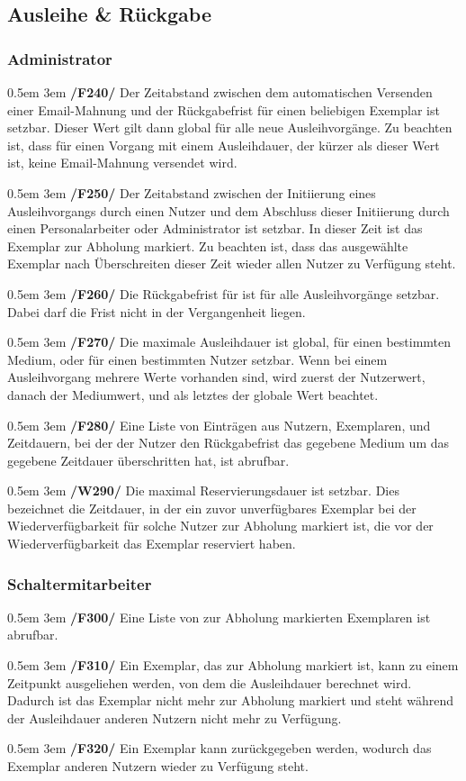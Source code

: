 \documentclass{article}
\newcommand{\specification}[3]{
	{\parindent 0.5em \hangindent 3em \hypertarget{spec:#1:#2}{\textbf{/#1#2/}} #3 \par \nobreak \vspace*{0.5em}}
}
\begin{document}
	\subsection{Ausleihe \& Rückgabe}
		\subsubsection{Administrator}
			\specification{F}{240}{Der Zeitabstand zwischen dem automatischen Versenden einer Email-Mahnung und der Rückgabefrist für einen beliebigen Exemplar ist setzbar.
				Dieser Wert gilt dann global für alle neue Ausleihvorgänge. Zu beachten ist, dass für einen Vorgang mit einem Ausleihdauer, der kürzer als dieser Wert ist, keine Email-Mahnung versendet wird. }
			\specification{F}{250}{Der Zeitabstand zwischen der Initiierung eines Ausleihvorgangs durch einen Nutzer und dem Abschluss dieser Initiierung durch einen Personalarbeiter oder Administrator ist setzbar.
				In dieser Zeit ist das Exemplar zur Abholung markiert. Zu beachten ist, dass das ausgewählte Exemplar nach Überschreiten dieser Zeit wieder allen Nutzer zu Verfügung steht. }
			\specification{F}{260}{Die Rückgabefrist für ist für alle Ausleihvorgänge setzbar. Dabei darf die Frist nicht in der Vergangenheit liegen. }
			\specification{F}{270}{Die maximale Ausleihdauer ist global, für einen bestimmten Medium, oder für einen bestimmten Nutzer setzbar.
				Wenn bei einem Ausleihvorgang mehrere Werte vorhanden sind, wird zuerst der Nutzerwert, danach der Mediumwert, und als letztes der globale Wert beachtet. }
			\specification{F}{280}{Eine Liste von Einträgen aus Nutzern, Exemplaren, und Zeitdauern, bei der der Nutzer den Rückgabefrist das gegebene Medium um das gegebene Zeitdauer überschritten hat, ist abrufbar. }
			\specification{W}{290}{Die maximal Reservierungsdauer ist setzbar.
				Dies bezeichnet die Zeitdauer, in der ein zuvor unverfügbares Exemplar bei der Wiederverfügbarkeit für solche Nutzer zur Abholung markiert ist, die vor der Wiederverfügbarkeit das Exemplar reserviert haben.  }
		\subsubsection{Schaltermitarbeiter}
			\specification{F}{300}{Eine Liste von zur Abholung markierten Exemplaren ist abrufbar. }
			\specification{F}{310}{Ein Exemplar, das zur Abholung markiert ist, kann zu einem Zeitpunkt ausgeliehen werden, von dem die Ausleihdauer berechnet wird.
				Dadurch ist das Exemplar nicht mehr zur Abholung markiert und steht während der Ausleihdauer anderen Nutzern nicht mehr zu Verfügung. }
			\specification{F}{320}{Ein Exemplar kann zurückgegeben werden, wodurch das Exemplar anderen Nutzern wieder zu Verfügung steht. }
\end{document}

